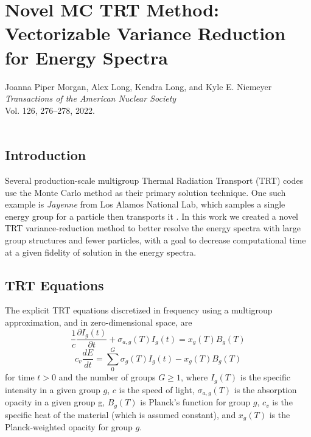 \renewcommand{\TheTitle}{Novel MC TRT Method: Vectorizable Variance Reduction for Energy Spectra}
\renewcommand{\TheAuthors}{%
  Joanna Piper Morgan,
  Alex Long,
  Kendra Long, 
  and Kyle E. Niemeyer}
  
\renewcommand{\TheAddress}{%
    \textit{Transactions of the American Nuclear Society} \\
    Vol. 126, 276--278, 2022. \\
    \doi{10.13182/T126-38066} \\
    \zenodo{6643659}
    
}

\chapter{\TheTitle}
\label{chapter:trt_paper}

\vspace{1em}
\TheAuthors\\
\TheAddress


\section{Introduction}
Several production-scale multigroup Thermal Radiation Transport (TRT) codes use the Monte Carlo method as their primary solution technique.
One such example is \textit{Jayenne} from Los Alamos National Lab, which samples a single energy group for a particle then transports it \cite{Thompson_2021}. 
In this work we created a novel TRT variance-reduction method to better resolve the energy spectra with large group structures and fewer particles, with a goal to decrease computational time at a given fidelity of solution in the energy spectra.

\section{TRT Equations}

The explicit TRT equations discretized in frequency using a multigroup approximation, and in zero-dimensional space, are \cite{Pomraning1973}
\begin{equation}
    \frac{1}{c}\frac{\partial I_g(t)}{\partial t} + \sigma_{a,g}(T)I_{g}(t) = x_{g}(T)B_{g}(T)
\end{equation}
%
\begin{equation}
    c_{v}\frac{dE}{dt} = \sum_{0}^{G}{\sigma_{g}(T)I_{g}(t) - x_{g}(T)B_{g}(T)}
\end{equation}
for time $t>0$ and the number of groups $G \geq 1$, where $I_{g}(T)$ is the specific intensity in a given group $g$, $c$ is the speed of light, $\sigma_{a,g}(T)$ is the absorption opacity in a given group g, $B_{g}(T)$ is Planck's function for group $g$, $c_v$ is the specific heat of the material (which is assumed constant), and $x_{g}(T)$ is the Planck-weighted opacity for group $g$.

